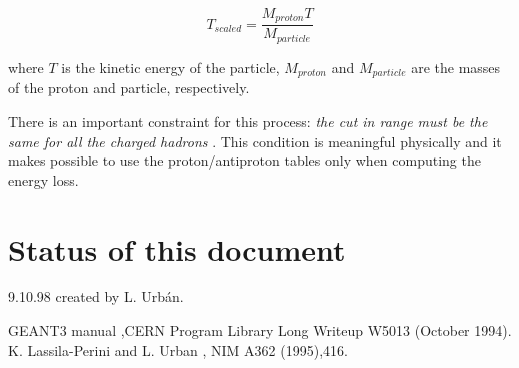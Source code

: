    \begin{equation}
     T_{scaled} = \frac{ M_{proton} T}{ M_{particle}}
   \end{equation}

  where \(T\) is the kinetic energy of the particle, $M_{proton}$ and
  $M_{particle}$ are the masses of the proton and particle, respectively.

  There is an important constraint for this process:
  {\em the cut in range must be the same for all the charged hadrons} .
  This condition is meaningful physically and it makes possible to use
  the proton/antiproton tables only when computing the energy loss.
\section{Status of this document}
 9.10.98  created by L. Urb\'an.
 
\begin{thebibliography}{99}

  GEANT3 manual ,CERN Program Library Long Writeup W5013 (October 1994).
  K. Lassila-Perini and L. Urban , NIM A362 (1995),416.

\end{thebibliography}


